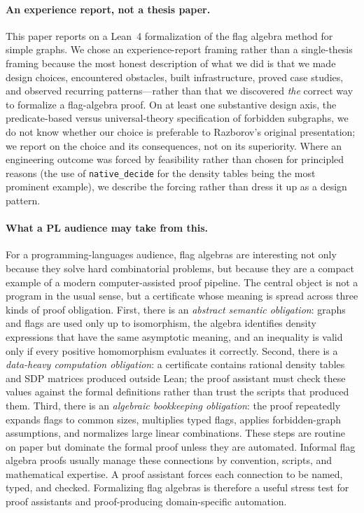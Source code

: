 \documentclass{article}
\newcommand{\lean}[1]{\texttt{#1}}
\begin{document}
\paragraph{An experience report, not a thesis paper.}
This paper reports on a Lean~4 formalization of the flag algebra method for
simple graphs.  We chose an experience-report framing rather than a
single-thesis framing because the most honest description of what we did is
that we made design choices, encountered obstacles, built infrastructure,
proved case studies, and observed recurring patterns---rather than that we
discovered \emph{the} correct way to formalize a flag-algebra proof.  On at
least one substantive design axis, the predicate-based versus
universal-theory specification of forbidden subgraphs, we do not know whether
our choice is preferable to Razborov's original presentation; we report on
the choice and its consequences, not on its superiority.  Where an engineering
outcome was forced by feasibility rather than chosen for principled reasons
(the use of \lean{native\_decide} for the density tables being the most
prominent example), we describe the forcing rather than dress it up as a
design pattern.

\paragraph{What a PL audience may take from this.}
For a programming-languages audience, flag algebras are interesting not only
because they solve hard combinatorial problems, but because they are a
compact example of a modern computer-assisted proof pipeline.  The central
object is not a program in the usual sense, but a certificate whose meaning
is spread across three kinds of proof obligation.  First, there is an
\emph{abstract semantic obligation}: graphs and flags are used only up to
isomorphism, the algebra identifies density expressions that have the same
asymptotic meaning, and an inequality is valid only if every positive
homomorphism evaluates it correctly.  Second, there is a \emph{data-heavy
computation obligation}: a certificate contains rational density tables and
SDP matrices produced outside Lean; the proof assistant must check these
values against the formal definitions rather than trust the scripts that
produced them.  Third, there is an \emph{algebraic bookkeeping obligation}:
the proof repeatedly expands flags to common sizes, multiplies typed flags,
applies forbidden-graph assumptions, and normalizes large linear
combinations.  These steps are routine on paper but dominate the formal proof
unless they are automated.  Informal flag algebra proofs usually manage these
connections by convention, scripts, and mathematical expertise.  A proof
assistant forces each connection to be named, typed, and checked.
Formalizing flag algebras is therefore a useful stress test for proof
assistants and proof-producing domain-specific automation.
\end{document}

